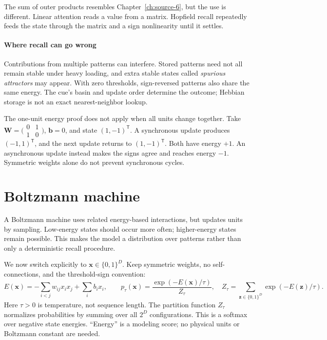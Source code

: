 \documentclass[11pt, oneside]{book}
\newcommand{\T}{^{\mathsf{T}}}           %
\let\originalsection\section
\renewcommand{\section}{\Needspace{7\baselineskip}\originalsection}
\begin{document}
The sum of outer products resembles Chapter~\ref{ch:source-6}, but the use is different. Linear attention reads a value from a matrix. Hopfield recall repeatedly feeds the state through the matrix and a sign nonlinearity until it settles.

\paragraph{Where recall can go wrong} Contributions from multiple patterns can interfere. Stored patterns need not all remain stable under heavy loading, and extra stable states called \emph{spurious attractors} may appear. With zero thresholds, sign-reversed patterns also share the same energy. The cue's basin and update order determine the outcome; Hebbian storage is not an exact nearest-neighbor lookup.

\begin{notebox}[title={Synchronous updates can cycle}]
The one-unit energy proof does not apply when all units change together. Take $\mathbf{W}=\bigl(\begin{smallmatrix}0&1\\1&0\end{smallmatrix}\bigr)$, $\mathbf{b}=0$, and state $(1,-1)\T$. A synchronous update produces $(-1,1)\T$, and the next update returns to $(1,-1)\T$. Both have energy $+1$. An asynchronous update instead makes the signs agree and reaches energy $-1$. Symmetric weights alone do not prevent synchronous cycles.
\end{notebox}

\section{Boltzmann machine}\label{sec:source-10-3}
A Boltzmann machine uses related energy-based interactions, but updates units by sampling. Low-energy states should occur more often; higher-energy states remain possible. This makes the model a distribution over patterns rather than only a deterministic recall procedure.

We now switch explicitly to $\mathbf{x}\in\{0,1\}^D$. Keep symmetric weights, no self-connections, and the threshold-sign convention:
\[
 E(\mathbf{x})=-\sum_{i<j}w_{ij}x_ix_j+\sum_i b_ix_i,
 \qquad
 p_\tau(\mathbf{x})=\frac{\exp(-E(\mathbf{x})/\tau)}{Z_\tau},
 \quad Z_\tau=\sum_{\mathbf{z}\in\{0,1\}^D}\exp(-E(\mathbf{z})/\tau).
\]
Here $\tau>0$ is temperature, not sequence length. The partition function $Z_\tau$ normalizes probabilities by summing over all $2^D$ configurations. This is a softmax over negative state energies. ``Energy'' is a modeling score; no physical units or Boltzmann constant are needed.
\end{document}
